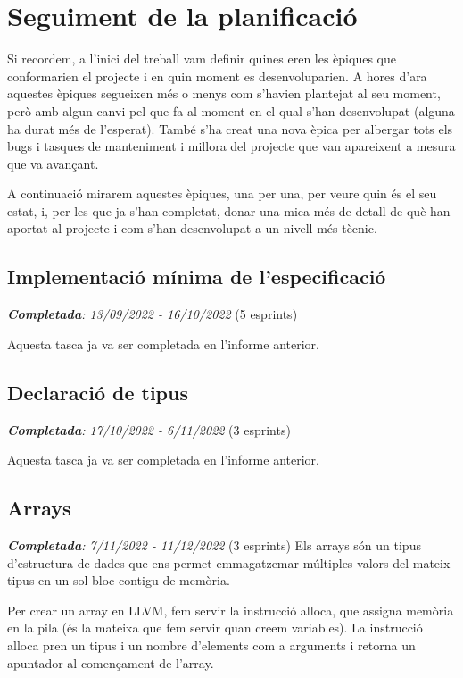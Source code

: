 ﻿\documentclass{article}
\begin{document}
\section{Seguiment de la planificació}

Si recordem, a l'inici del treball vam definir quines eren les èpiques que
conformarien el projecte i en quin moment es desenvoluparien. A hores d'ara
aquestes èpiques segueixen més o menys com s'havien plantejat al seu moment,
però amb algun canvi pel que fa al moment en el qual s'han desenvolupat (alguna
ha durat més de l'esperat). També s'ha creat una nova èpica per albergar tots
els bugs i tasques de manteniment i millora del projecte que van apareixent a
mesura que va avançant. 

A continuació mirarem aquestes èpiques, una per una, per veure quin és el seu
estat, i, per les que ja s'han completat, donar una mica més de detall de què
han aportat al projecte i com s'han desenvolupat a un nivell més tècnic.

\subsection{Implementació mínima de l'especificació}
\textit{\textbf{Completada}: 13/09/2022 - 16/10/2022} (5 esprints)

Aquesta tasca ja va ser completada en l'informe anterior.

\subsection{Declaració de tipus}
\textit{\textbf{Completada}: 17/10/2022 - 6/11/2022} (3 esprints)

Aquesta tasca ja va ser completada en l'informe anterior.

\subsection{Arrays}
\textit{\textbf{Completada}: 7/11/2022 - 11/12/2022} (3 esprints)
Els arrays són un tipus d'estructura de dades que ens permet emmagatzemar 
múltiples valors del mateix tipus en un sol bloc contigu de memòria. 

Per crear un array en LLVM, fem servir la instrucció alloca, que assigna memòria
en la pila (és la mateixa que fem servir quan creem variables). La instrucció
alloca pren un tipus i un nombre d'elements com a arguments i retorna un
apuntador al començament de l'array.
\end{document}
